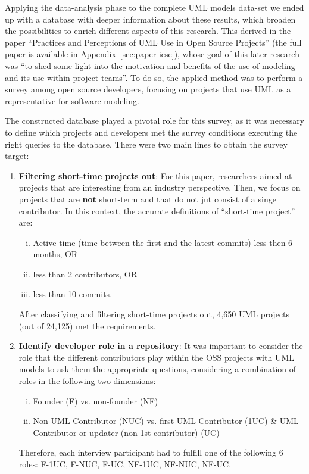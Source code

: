 \documentclass[a4paper, 12pt]{book}
\begin{document}
Applying the data-analysis phase to the complete UML models data-set we ended up with a database with deeper information about these results,
which broaden the possibilities to enrich different aspects of this research. This derived in the paper ``Practices and Perceptions of UML Use
in Open Source Projects'' (the full paper is available in Appendix~\ref{sec:paper-icse}), whose goal of this later research was ``to shed some
light into the motivation and benefits of the use of modeling and its use within project teams''. To do so, the applied method was to
perform a survey among open source developers, focusing on projects that use UML as a representative for software modeling.

The constructed database played a pivotal role for this survey, as it was necessary to define which projects and developers met the
survey conditions executing the right queries to the database. There were two main lines to obtain the survey target:
\begin{enumerate}
  \item \textbf{Filtering short-time projects out}: For this paper, researchers aimed
  at projects that are interesting from an industry perspective. Then, we focus on projects that are \textbf{not} short-term and that
  do not jut consist of a singe contributor. In this context, the accurate definitions of ``short-time project'' are:
  \begin{enumerate}[i.]
    \item Active time (time between the first and the latest commits) less then 6 months, OR
    \item less than 2 contributors, OR
    \item less than 10 commits.
  \end{enumerate}
  After classifying and filtering short-time projects out, 4,650 UML projects (out of 24,125) met the requirements.
  \item \textbf{Identify developer role in a repository}: It was important to consider the role that the different contributors
  play within the OSS projects with UML models to ask them the appropriate questions, considering a combination of roles in the
  following two dimensions:
  \begin{enumerate}[i.]
    \item Founder (F) vs. non-founder (NF)
    \item Non-UML Contributor (NUC) vs. first UML Contributor (1UC) \& UML Contributor or updater (non-1st contributor) (UC)
  \end{enumerate}
  Therefore, each interview participant had to fulfill one of the following 6 roles: F-1UC, F-NUC, F-UC, NF-1UC, NF-NUC, NF-UC.
\end{enumerate}
\end{document}

